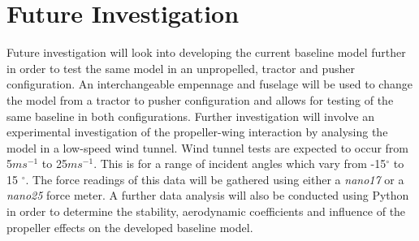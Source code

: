 \section{Future Investigation}
\label{sec: Future Investigation}

Future investigation will look into developing the current baseline model further in order to test the same model in an unpropelled, tractor and pusher configuration. An interchangeable empennage and fuselage will be used to change the model from a tractor to pusher configuration and allows for testing of the same baseline in both configurations. Further investigation will involve an experimental investigation of the propeller-wing interaction by analysing the model in a low-speed wind tunnel. Wind tunnel tests are expected to occur from 5$ms^{-1}$ to 25$ms^{-1}$. This is for a range of incident angles which vary from -15$^\circ$ to 15 $^\circ$. The force readings of this data will be gathered using either a \textit{nano17} or a \textit{nano25} force meter. A further data analysis will also be conducted using Python in order to determine the stability, aerodynamic coefficients and influence of the propeller effects on the developed baseline model. 

